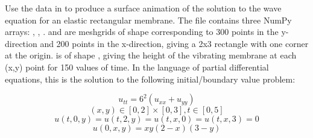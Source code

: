 \begin{problem}
Use the data in  to produce a surface animation of the solution to the wave equation for an elastic rectangular membrane.
The file contains three NumPy arrays: , , .
 and  are meshgrids of shape  corresponding to 300 points in the y-direction and 200 points in the x-direction, giving a 2x3 rectangle with one corner at the origin.
 is of shape , giving the height of the vibrating membrane at each (x,y) point for 150 values of time. 
In the language of partial differential equations, this is the solution to the following initial/boundary value problem:

$$u_{tt} = 6^2(u_{xx}+u_{yy})$$
$$(x,y) \in [0,2]\times[0,3], t \in [0,5]$$
$$u(t,0,y)=u(t,2,y)=u(t,x,0)=u(t,x,3) = 0$$
$$u(0,x,y) = xy(2-x)(3-y)$$
\end{problem}
